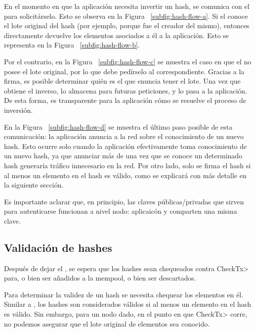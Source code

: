 %
En el momento en que la aplicación necesita invertir un hash, se comunica con el \hcollector
para solicitárselo. Esto se observa en la Figura ~\ref{subfig:hash-flow-a}.
%
Si el \hcollector conoce el lote original del hash (por ejemplo, porque fue el \hcollector creador
del mismo), entonces directamente devuelve los elementos asociados a él a la aplicación.
Esto se representa en la Figura ~\ref{subfig:hash-flow-b}.
%

Por el contrario, en la Figura ~\ref{subfig:hash-flow-c} se muestra el caso en que el \hcollector no posee el lote original,
por lo que debe pedírselo al \hcollector correspondiente. Gracias a la firma, es posible determinar
quién es el \hcollector que enuncia tener el lote. Una vez que obtiene el inverso, lo almacena para
futuras peticiones, y lo pasa a la aplicación. De esta forma, es transparente para la aplicación
cómo se resuelve el proceso de inversión.

%

En la Figura ~\ref{subfig:hash-flow-d} se muestra el último paso posible de esta comunicación: la aplicación
anuncia a la red sobre el conocimiento de un nuevo hash. Esto ocurre solo cuando la aplicación
efectivamente toma conocimiento de un nuevo hash, ya que anunciar más de una vez que se conoce un
determinado hash generaría tráfico innecesario en la red. Por otro lado, solo se firma el hash si al
menos un elemento en el hash es válido, como se explicará con más detalle en la siguiente sección.

%

Es importante aclarar que, en principio, las claves públicas/privadas que sirven para autenticarse
funcionan a nivel nodo: aplicaicón y \hcollector comparten una misma clave.

\subsection{Validación de hashes}

Después de dejar el \hcollector, se espera que los hashes sean chequeados contra \<CheckTx>
para, o bien ser añadidos a la mempool, o bien ser descartados.

%
Para determinar la validez de un hash se necesita chequear los elementos en él. Similar a
\compresschain, los hashes son considerados válidos si al menos un elemento
en el hash es válido.
%
Sin embargo, para un nodo dado, en el punto en que \<CheckTx> corre, no podemos asegurar que el
lote original de elementos sea conocido.

